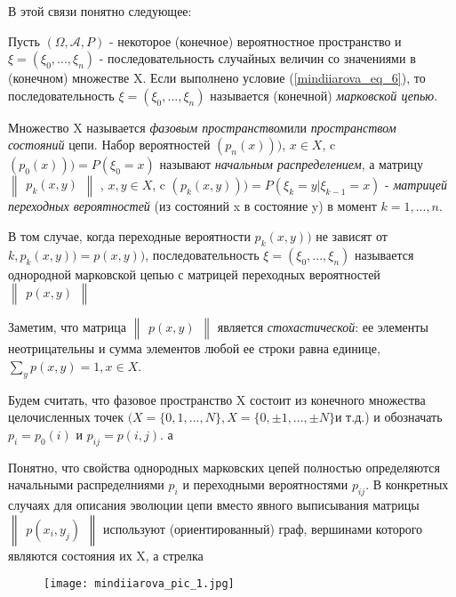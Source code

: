 В этой связи понятно следующее:


\begin{definition}
Пусть $(\Omega,  \mathscr{A}, P)$ - некоторое (конечное) вероятностное пространство и $\xi = (\xi_0, ...,\xi_n)$ - последовательность случайных величин со значениями в (конечном) множестве X. Если выполнено условие (\ref{mindiiarova_eq_6}), то последовательность $\xi = (\xi_0, ...,\xi_n)$ называется (конечной) \textit{марковской цепью}.


Множество X называется \textit{фазовым пространством}или \textit{пространством состояний} цепи. Набор вероятностей $(p_n(x)))$, $x\in X$, c $(p_0(x))) = P(\xi_0=x)$ называют \textit{начальным распределением}, а матрицу 
$
\begin{Vmatrix}
    p_k (x,y)
\end{Vmatrix}
$
, $x,y \in X$, c  $(p_k(x, y))) = P(\xi_k=y|\xi_{k-1}=x)$ - \textit{матрицей переходных вероятностей} (из состояний x в состояние y) в момент $k = 1, ..., n$.


В том случае, когда переходные вероятности $p_k(x, y))$ не зависят от 
$k,p_k(x, y)) = p(x, y))$, последовательность $\xi = (\xi_0, ...,\xi_n)$ называется однородной марковской цепью с матрицей переходных вероятностей 
$\begin{Vmatrix}
    p(x,y)
\end{Vmatrix}$
\end{definition}

Заметим, что матрица 
$\begin{Vmatrix}
    p(x,y)
\end{Vmatrix}$
является \textit{стохастической}: ее элементы неотрицательны и сумма элементов любой ее строки равна единице,  $\sum\limits_{y}p(x, y) = 1 , x \in X$.

Будем считать, что фазовое пространство X состоит из конечного множества целочисленных точек $(X = \{0, 1,... , N\}, X = \{0, \pm1, ..., \pm{N}\}$и т.д.) и обозначать $p_i=p_0(i)$ и $p_{ij} = p(i, j)$. а 


Понятно, что свойства однородных марковских цепей полностью определяются начальными распределниями $p_i$ и переходными вероятностями $p_{i j}$. В конкретных случаях для описания эволюции цепи вместо явного выписывания матрицы $\begin{Vmatrix}
    p(x_i,y_j)
\end{Vmatrix}$ используют (ориентированный) граф, вершинами которого являются состояния их X, а стрелка 

\begin{figure}[h]
\centering
\texttt{[image: mindiiarova\_pic\_1.jpg]}
\label{fig:mpr}
\end{figure}


